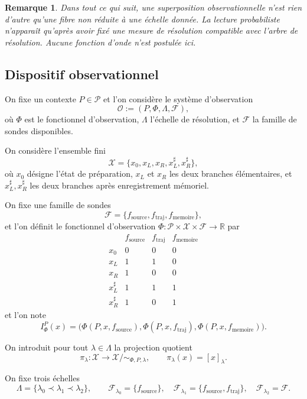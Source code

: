 \documentclass[11pt,a4paper,openany]{book}
\newtheorem{remark}[definition]{Remarque}
\begin{document}
\begin{remark}
Dans tout ce qui suit, une superposition observationnelle n'est rien d'autre qu'une fibre non réduite à une échelle donnée. La lecture probabiliste n'apparaît qu'après avoir fixé une mesure de résolution compatible avec l'arbre de résolution. Aucune fonction d'onde n'est postulée ici.
\end{remark}

\subsection*{Dispositif observationnel}

On fixe un contexte \(P\in\mathcal P\) et l'on considère le système d'observation
\[
\mathcal O:=(P,\Phi,\Lambda,\mathcal F),
\]
où \(\Phi\) est le fonctionnel d'observation, \(\Lambda\) l'échelle de résolution, et \(\mathcal F\) la famille de sondes disponibles.

On considère l'ensemble fini
\[
\mathcal X=\{x_0,x_L,x_R,x_L^\sharp,x_R^\sharp\},
\]
où \(x_0\) désigne l'état de préparation, \(x_L\) et \(x_R\) les deux branches élémentaires, et \(x_L^\sharp,x_R^\sharp\) les deux branches après enregistrement mémoriel.

On fixe une famille de sondes
\[
\mathcal F=\{f_{\mathrm{source}},f_{\mathrm{traj}},f_{\mathrm{memoire}}\},
\]
et l'on définit le fonctionnel d'observation \(\Phi:\mathcal P\times\mathcal X\times\mathcal F\to\mathbb R\) par
\[
\begin{array}{c|ccc}
& f_{\mathrm{source}} & f_{\mathrm{traj}} & f_{\mathrm{memoire}}\\ \hline
x_0 & 0 & 0 & 0\\
x_L & 1 & 1 & 0\\
x_R & 1 & 0 & 0\\
x_L^\sharp & 1 & 1 & 1\\
x_R^\sharp & 1 & 0 & 1
\end{array}
\]
et l'on note
\[
I_\Phi^P(x)=\bigl(\Phi(P,x,f_{\mathrm{source}}),\Phi(P,x,f_{\mathrm{traj}}),\Phi(P,x,f_{\mathrm{memoire}})\bigr).
\]

On introduit pour tout \(\lambda\in\Lambda\) la projection quotient
\[
\pi_\lambda:\mathcal X\longrightarrow \mathcal X/{\sim_{\Phi,P,\lambda}},
\qquad
\pi_\lambda(x)=[x]_\lambda.
\]

On fixe trois échelles
\[
\Lambda=\{\lambda_0\prec\lambda_1\prec\lambda_2\},
\qquad
\mathcal F_{\lambda_0}=\{f_{\mathrm{source}}\},\quad
\mathcal F_{\lambda_1}=\{f_{\mathrm{source}},f_{\mathrm{traj}}\},\quad
\mathcal F_{\lambda_2}=\mathcal F.
\]
\end{document}
